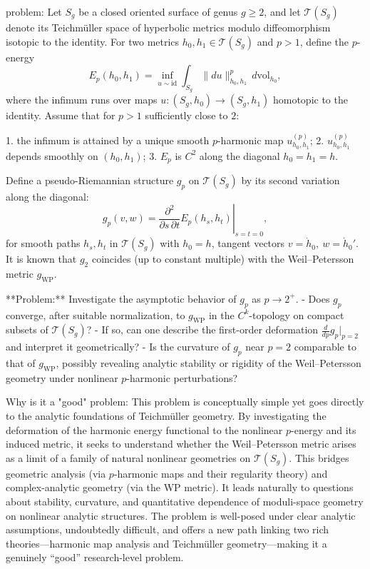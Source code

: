 problem:  
Let \(S_g\) be a closed oriented surface of genus \(g\ge2\), and let \(\mathcal{T}(S_g)\) denote its Teichmüller space of hyperbolic metrics modulo diffeomorphism isotopic to the identity. For two metrics \(h_0, h_1 \in \mathcal{T}(S_g)\) and \(p>1\), define the \(p\)-energy  
\[
E_p(h_0,h_1)=\inf_{u\sim\mathrm{id}}\int_{S_g}\|du\|_{h_0,h_1}^p\,d\mathrm{vol}_{h_0},
\]
where the infimum runs over maps \(u:(S_g,h_0)\to(S_g,h_1)\) homotopic to the identity.  
Assume that for \(p>1\) sufficiently close to \(2\):  

1. the infimum is attained by a unique smooth \(p\)-harmonic map \(u^{(p)}_{h_0,h_1}\);  
2. \(u^{(p)}_{h_0,h_1}\) depends smoothly on \((h_0,h_1)\);  
3. \(E_p\) is \(C^2\) along the diagonal \(h_0=h_1=h\).  

Define a pseudo-Riemannian structure \(g_p\) on \(\mathcal{T}(S_g)\) by its second variation along the diagonal:
\[
g_p(v,w)=\left.\frac{\partial^2}{\partial s\,\partial t}E_p(h_{s},h_{t})\right|_{s=t=0},
\]
for smooth paths \(h_s,h_t\) in \(\mathcal{T}(S_g)\) with \(h_0=h\), tangent vectors \(v=\dot{h}_0,\ w=\dot{h}_0'\).  
It is known that \(g_2\) coincides (up to constant multiple) with the Weil–Petersson metric \(g_{\mathrm{WP}}\).

**Problem:**  
Investigate the asymptotic behavior of \(g_p\) as \(p\to2^+\).  
- Does \(g_p\) converge, after suitable normalization, to \(g_{\mathrm{WP}}\) in the \(C^k\)-topology on compact subsets of \(\mathcal{T}(S_g)\)?  
- If so, can one describe the first-order deformation \(\frac{d}{dp}g_p|_{p=2}\) and interpret it geometrically?  
- Is the curvature of \(g_p\) near \(p=2\) comparable to that of \(g_{\mathrm{WP}}\), possibly revealing analytic stability or rigidity of the Weil–Petersson geometry under nonlinear \(p\)-harmonic perturbations?  

Why is it a "good" problem:  
This problem is conceptually simple yet goes directly to the analytic foundations of Teichmüller geometry. By investigating the deformation of the harmonic energy functional to the nonlinear \(p\)-energy and its induced metric, it seeks to understand whether the Weil–Petersson metric arises as a limit of a family of natural nonlinear geometries on \(\mathcal{T}(S_g)\). This bridges geometric analysis (via \(p\)-harmonic maps and their regularity theory) and complex-analytic geometry (via the WP metric). It leads naturally to questions about stability, curvature, and quantitative dependence of moduli-space geometry on nonlinear analytic structures. The problem is well-posed under clear analytic assumptions, undoubtedly difficult, and offers a new path linking two rich theories—harmonic map analysis and Teichmüller geometry—making it a genuinely “good” research-level problem.
